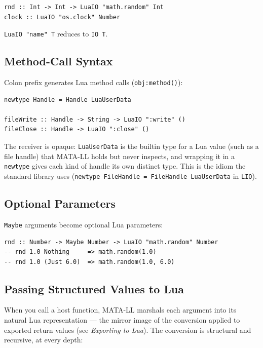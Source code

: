 \documentclass[11pt,a4paper]{article}
\begin{document}
\begin{lstlisting}
rnd :: Int -> Int -> LuaIO "math.random" Int
clock :: LuaIO "os.clock" Number
\end{lstlisting}

\texttt{LuaIO "name" T} reduces to \texttt{IO T}.

\subsection{Method-Call Syntax}

Colon prefix generates Lua method calls (\texttt{obj:method()}):

\begin{lstlisting}
newtype Handle = Handle LuaUserData

fileWrite :: Handle -> String -> LuaIO ":write" ()
fileClose :: Handle -> LuaIO ":close" ()
\end{lstlisting}

The receiver is opaque: \texttt{LuaUserData} is the builtin type for a
Lua value (such as a file handle) that MATA-LL holds but never
inspects, and wrapping it in a \texttt{newtype} gives each kind of
handle its own distinct type.  This is the idiom the standard library
uses (\texttt{newtype FileHandle = FileHandle LuaUserData} in
\texttt{LIO}).

\subsection{Optional Parameters}

\texttt{Maybe} arguments become optional Lua parameters:

\begin{lstlisting}
rnd :: Number -> Maybe Number -> LuaIO "math.random" Number
-- rnd 1.0 Nothing     => math.random(1.0)
-- rnd 1.0 (Just 6.0)  => math.random(1.0, 6.0)
\end{lstlisting}

\subsection{Passing Structured Values to Lua}
\label{sec:argmarshal}

When you call a host function, MATA-LL marshals each argument into its
natural Lua representation --- the mirror image of the conversion applied
to exported return values (see \emph{Exporting to Lua}).  The conversion
is structural and recursive, at every depth:
\end{document}

